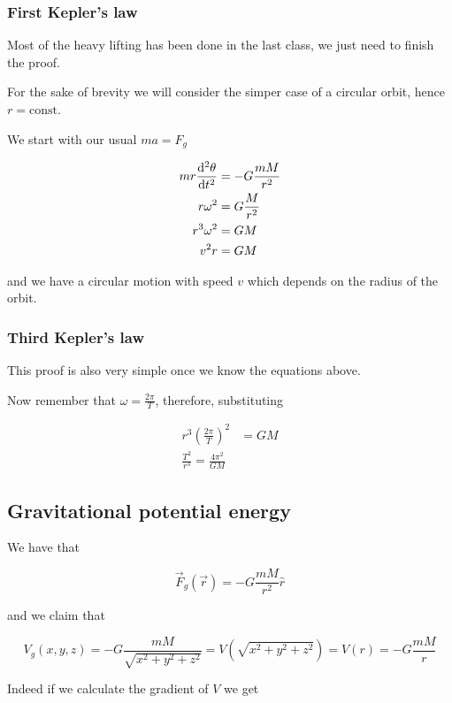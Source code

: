 \documentclass[10pt]{extarticle}
\begin{document}
\subsubsection{First Kepler's law}

Most of the heavy lifting has been done in the last class, we just need to finish the proof.

For the sake of brevity we will consider the simper case of a circular orbit, hence $r = \text{const}$.

We start with our usual $ma = F_g$

\begin{align*}
    m r \dv[2]{\theta}{t} & = - G \frac{m M}{r^2} \\
    r \omega^2            & = G \frac{M}{r^2}     \\
    r^3 \omega^2          & = G M                 \\
    v^2 r                 & = G M
\end{align*}

and we have a circular motion with speed $v$ which depends on the radius of the orbit.

\subsubsection{Third Kepler's law}

This proof is also very simple once we know the equations above.

Now remember that $\omega = \frac{2 \pi}{T}$, therefore, substituting

\begin{align*}
    r^3 \left(\frac{2 \pi}{T}\right)^2 & = G M \\
    \frac{T^2}{r^3} = \frac{4 \pi^2}{G M}
\end{align*}

\subsection{Gravitational potential energy}

We have that

$$
    \vec F_g (\vec r) = - G \frac{m M}{r^2} \hat r
$$

and we claim that

$$
    V_g(x, y, z) = - G \frac{m M}{\sqrt{x^2 + y^2 + z^2}} = V(\sqrt{x^2 + y^2 + z^2}) = V(r) = - G \frac{m M}{r}
$$

Indeed if we calculate the gradient of $V$ we get
\end{document}
